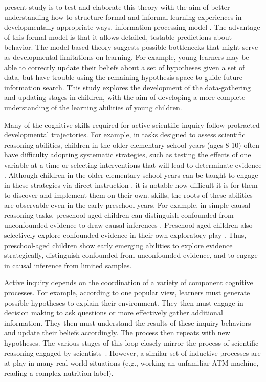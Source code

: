 \documentclass[10pt,letterpaper]{article}
\begin{document}
present study is to test and elaborate this theory with the aim of better 
understanding how to structure formal and informal learning experiences in 
developmentally appropriate ways. 
information processing model \cite{Gureckis:2012,Gureckis:2009,Markant:2012}. 
The advantage of this formal model is that it allows detailed, testable predictions 
about behavior. The model-based theory suggests possible bottlenecks that might 
serve as developmental limitations on learning. For example, young learners may be 
able to correctly update their beliefs about a set of hypotheses given a set of data, 
but have trouble using the remaining hypothesis space to guide future information 
search. This study explores the development of the data-gathering and updating 
stages in children, with the aim of developing a more complete understanding of the 
learning abilities of young children.

Many of the cognitive skills required for active scientific inquiry follow protracted 
developmental trajectories. For example, in tasks designed to assess scientific 
reasoning abilities, children in the older elementary school years (ages 8-10) often 
have difficulty adopting systematic strategies, such as testing the effects of one 
variable at a time or selecting interventions that will lead to determinate evidence 
\cite{Chen:1999}. Although children in the older elementary school years can be 
taught to engage in these strategies via direct instruction \cite{Klahr:2004,Kuhn:
2005}, it is notable how difficult it is for them to discover and implement them on 
their own. 
skills, the roots of these abilities are observable even in the early preschool years. 
For example, in simple causal reasoning tasks, preschool-aged children can 
distinguish confounded from unconfounded evidence to draw causal inferences 
\cite{Gopnik:2001,Kushnir:2005,Kushnir:2007,Schulz:2004}. Preschool-aged 
children also selectively explore confounded evidence in their own exploratory play 
\cite{Cook:2011,Gweon:2008,Schulz:2007}. Thus, preschool-aged children show 
early emerging abilities to explore evidence strategically, distinguish confounded 
from unconfounded evidence, and to engage in causal inference from limited 
samples.

Active inquiry depends on the coordination of a variety of component cognitive 
processes.  For example, according to one popular view, learners must generate 
possible hypotheses to explain their environment.  They then must engage in 
decision making to ask questions or more effectively gather additional information.  
They then must understand the results of these inquiry behaviors and update their 
beliefs accordingly.  The process then repeats with new hypotheses.  The various 
stages of this loop closely mirror the process of scientific reasoning engaged by 
scientists~\cite{Russell:1993,Klein:2006a,Klein:2006b}. However, a similar set of 
inductive processes are at play in many real-world situations (e.g., working an 
unfamiliar ATM machine, reading a complex nutrition label).
\end{document}
